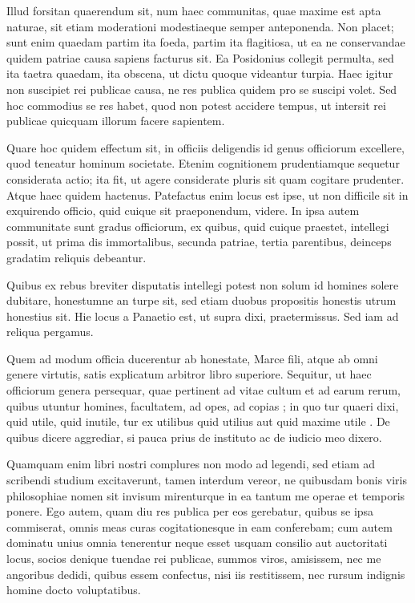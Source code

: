  Illud forsitan quaerendum sit, num haec communitas, quae maxime est apta naturae, sit etiam moderationi modestiaeque semper anteponenda. Non placet; sunt enim quaedam partim ita foeda, partim ita flagitiosa, ut ea ne conservandae quidem patriae causa sapiens facturus sit. Ea Posidonius collegit permulta, sed ita taetra quaedam, ita obscena, ut dictu quoque videantur turpia. Haec igitur non suscipiet rei publicae causa, ne res publica quidem pro se suscipi volet. Sed hoc commodius se res habet, quod non potest accidere tempus, ut intersit rei publicae quicquam illorum facere sapientem.

 Quare hoc quidem effectum sit, in officiis deligendis id genus officiorum excellere, quod teneatur hominum societate. Etenim cognitionem prudentiamque sequetur considerata actio; ita fit, ut agere considerate pluris sit quam cogitare prudenter. Atque haec quidem hactenus. Patefactus enim locus est ipse, ut non difficile sit in exquirendo officio, quid cuique sit praeponendum, videre. In ipsa autem communitate sunt gradus officiorum, ex quibus, quid cuique praestet, intellegi possit, ut prima dis immortalibus, secunda patriae, tertia parentibus, deinceps gradatim reliquis debeantur.

 Quibus ex rebus breviter disputatis intellegi potest non solum id homines solere dubitare, honestumne an turpe sit, sed etiam duobus propositis honestis utrum honestius sit. Hie locus a Panaetio est, ut supra dixi, praetermissus. Sed iam ad reliqua pergamus.

 Quem ad modum officia ducerentur ab honestate, Marce fili, atque ab omni genere virtutis, satis explicatum arbitror libro superiore. Sequitur, ut haec officiorum genera persequar, quae pertinent ad vitae cultum et ad earum rerum, quibus utuntur homines, facultatem, ad opes, ad copias ; in quo tur quaeri dixi, quid utile, quid inutile, tur ex utilibus quid utilius aut quid maxime utile . De quibus dicere aggrediar, si pauca prius de instituto ac de iudicio meo dixero.

 Quamquam enim libri nostri complures non modo ad legendi, sed etiam ad scribendi studium excitaverunt, tamen interdum vereor, ne quibusdam bonis viris philosophiae nomen sit invisum mirenturque in ea tantum me operae et temporis ponere. Ego autem, quam diu res publica per eos gerebatur, quibus se ipsa commiserat, omnis meas curas cogitationesque in eam conferebam; cum autem dominatu unius omnia tenerentur neque esset usquam consilio aut auctoritati locus, socios denique tuendae rei publicae, summos viros, amisissem, nec me angoribus dedidi, quibus essem confectus, nisi iis restitissem, nec rursum indignis homine docto voluptatibus.

